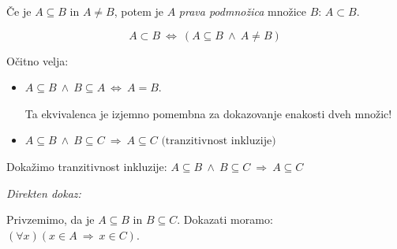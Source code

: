 \documentclass[11pt,paper=b5,footinclude,headinclude]{scrbook} %
\def\ali {{~\vee~}}
\def\inn {{~\wedge~}}
\def\sledi {{~\Rightarrow~}}
\def\cee {{~\Leftrightarrow~}}
\begin{document}
 Če je $A\subseteq B$ in $A\neq B$, potem je $A$ {\em prava podmnožica} množice $B$: $A\subset B$.

$$A\subset B\cee (A\subseteq B \inn A\neq B)$$

Očitno velja:
\begin{itemize}
  \item $A\subseteq B \inn B\subseteq A \cee A = B$.

  Ta ekvivalenca je izjemno pomembna za dokazovanje enakosti dveh množic!
  \item $A\subseteq B \inn B\subseteq C \sledi A \subseteq C \textrm{~(tranzitivnost inkluzije)}$
\end{itemize}


%
%
%
%
%
%
%
%
%
%
%
%
%
%

%
%

Dokažimo tranzitivnost inkluzije: $A\subseteq B \inn B\subseteq C \sledi A \subseteq C$

{\em Direkten dokaz:}

Privzemimo, da je $A\subseteq B$ in $B\subseteq C$.
Dokazati moramo: $(\forall x)(x\in A\sledi x\in C)$.
\end{document}
